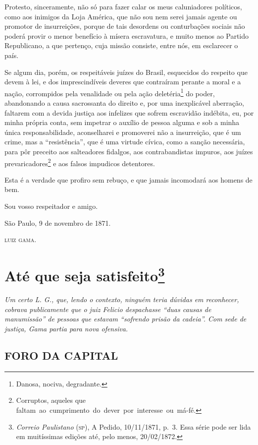 Protesto, sinceramente, não só para fazer calar os meus caluniadores
políticos, como aos inimigos da Loja América, que não sou nem serei
jamais agente ou promotor de insurreições, porque de tais desordens ou
conturbações sociais não poderá provir o menor benefício à mísera
escravatura, e muito menos ao Partido Republicano, a que pertenço, cuja
missão consiste, entre nós, em esclarecer o país.

Se algum dia, porém, os respeitáveis juízes do Brasil, esquecidos do
respeito que devem à lei, e dos imprescindíveis deveres que contraíram
perante a moral e a nação, corrompidos pela venalidade ou pela ação
deletéria\footnote{ Danosa, nociva, degradante.} do poder, abandonando
a causa sacrossanta do direito e, por uma inexplicável aberração,
faltarem com a devida justiça aos infelizes que sofrem escravidão
indébita, eu, por minha própria conta, sem impetrar o auxílio de pessoa
alguma e sob a minha única responsabilidade, aconselharei e promoverei
não a insurreição, que é um crime, mas a ``resistência'', que é uma
virtude cívica, como a sanção necessária, para pôr preceito aos
salteadores fidalgos, aos contrabandistas impuros, aos juízes
prevaricadores\footnote{ Corruptos, aqueles que
  faltam~ao~cumprimento~do~dever~por~interesse~ou~má-fé.} e aos falsos
impudicos detentores.

Esta é a verdade que profiro sem rebuço, e que jamais incomodará aos
homens de bem.

Sou vosso respeitador e amigo.

São Paulo, 9 de novembro de 1871.

\textsc{luiz gama}.

\chapter{Até que seja satisfeito\footnote{\emph{Correio Paulistano} (\textsc{sp}), A Pedido, 10/11/1871,
  p.~3. Essa série pode ser lida em muitíssimas edições até, pelo menos,
  20/02/1872.}} %

\begin{didascalia}
\emph{Um certo L. G., que, lendo o contexto, ninguém teria dúvidas em
reconhecer, cobrava publicamente que o juiz Felicio despachasse ``duas
causas de manumissão'' de pessoas que estavam ``sofrendo prisão da
cadeia''. Com sede de justiça, Gama partia para nova ofensiva.}
\end{didascalia}


\section{FORO DA CAPITAL}

